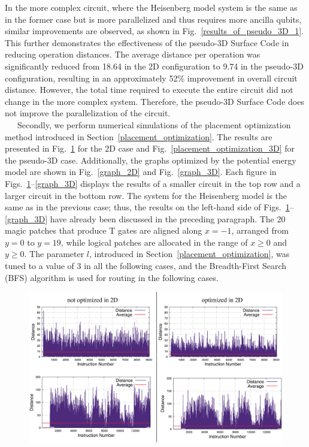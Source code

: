 \documentclass[a4paper,11pt]{ltjsarticle}
\begin{document}
{    In the more complex circuit, where the Heisenberg model system is the same as in the former case but is more parallelized and thus requires more ancilla qubits, similar improvements are observed, as shown in Fig.~\ref{results_of_pseudo_3D_1}. This further demonstrates the effectiveness of the pseudo-3D Surface Code in reducing operation distances. The average distance per operation was significantly reduced from 18.64 in the 2D configuration to 9.74 in the pseudo-3D configuration, resulting in an approximately 52\% improvement in overall circuit distance. However, the total time required to execute the entire circuit did not change in the more complex system. Therefore, the pseudo-3D Surface Code does not improve the parallelization of the circuit.\\
    \ \ \ Secondly, we perform numerical simulations of the placement optimization method introduced in Section~\ref{placement_optimization}. The results are presented in Fig.~\ref{placement_optimization_2D} for the 2D case and Fig.~\ref{placement_optimization_3D} for the pseudo-3D case. Additionally, the graphs optimized by the potential energy model are shown in Fig.~\ref{graph_2D} and Fig.~\ref{graph_3D}. Each figure in Figs.~\ref{placement_optimization_2D}--\ref{graph_3D} displays the results of a smaller circuit in the top row and a larger circuit in the bottom row. The system for the Heisenberg model is the same as in the previous case; thus, the results on the left-hand side of Figs.~\ref{placement_optimization_2D}--\ref{graph_3D} have already been discussed in the preceding paragraph. The 20 magic patches that produce T gates are aligned along $x = -1$, arranged from $y = 0$ to $y = 19$, while logical patches are allocated in the range of $x \geq 0$ and $y \geq 0$. The parameter $l$, introduced in Section~\ref{placement_optimization}, was tuned to a value of 3 in all the following cases, and the Breadth-First Search (BFS) algorithm is used for routing in the following cases.

    \begin{figure}[h]
        \centering
        \includegraphics[scale=0.5]{figure/placement_optimization_2D.eps}
        \vspace{-20pt}\caption{}
        \label{placement_optimization_2D}
    \end{figure}

}
\end{document}
